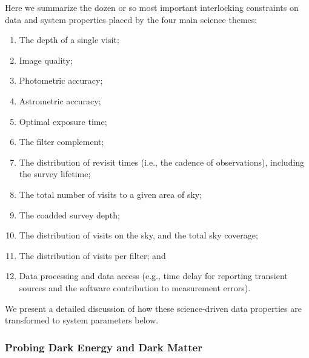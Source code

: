 \documentclass{emulateapj}
\begin{document}
Here we summarize the dozen or so most important interlocking constraints on data 
and system properties placed by the four main science themes: 

\begin{enumerate}
\item  The depth of a single visit;
\item  Image quality;
\item  Photometric accuracy;
\item  Astrometric accuracy;
\item  Optimal exposure time;
\item  The filter complement;
\item  The distribution of revisit times (i.e., the cadence of observations),
                including the survey lifetime;
\item  The total number of visits to a given area of sky;
\item  The coadded survey depth;
\item  The distribution of visits on the sky, and the total sky coverage;
\item  The distribution of visits per filter; and 
\item  Data processing and data access (e.g., time delay for reporting
         transient sources and the software contribution to measurement errors).
\end{enumerate}

We present a detailed discussion of how these science-driven data properties are
transformed to system parameters below. 


\subsubsection{Probing Dark Energy and Dark Matter}
\label{sec:Dark_Energy}
 
\end{document}
